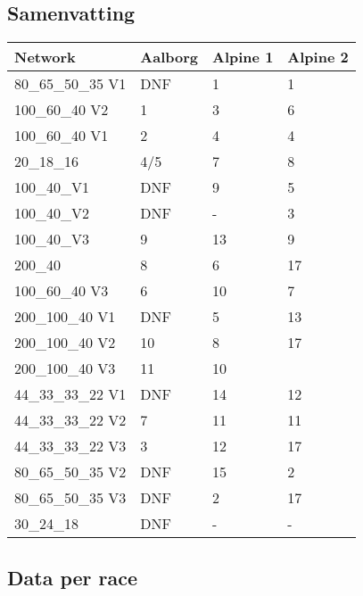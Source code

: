 \documentclass[a4paper,10pt]{scrartcl}
\begin{document}
\subsection*{Samenvatting}
\begin{table}[H]
\begin{tabular}{llll}
 \textbf{Network} & \textbf{Aalborg} & \textbf{Alpine 1} & \textbf{Alpine 2}\\ \hline
 80\_65\_50\_35 V1 & DNF & 1 & 1 \\
 100\_60\_40 V2 & 1 & 3 & 6\\
 100\_60\_40 V1 & 2 & 4 & 4 \\ \hline
 20\_18\_16 & 4/5 & 7 & 8 \\
 100\_40\_V1 & DNF & 9 & 5 \\
 100\_40\_V2 & DNF & - & 3\\
 100\_40\_V3 & 9 & 13 & 9 \\
 200\_40 & 8 & 6 & 17 \\
 100\_60\_40 V3 & 6 & 10 & 7 \\
 200\_100\_40 V1 & DNF & 5 & 13 \\
 200\_100\_40 V2 & 10 & 8 & 17\\
 200\_100\_40 V3 & 11 & 10 \\
 44\_33\_33\_22 V1 & DNF & 14 & 12\\
 44\_33\_33\_22 V2 & 7 & 11& 11\\
 44\_33\_33\_22 V3 & 3 & 12 & 17\\
 80\_65\_50\_35 V2 & DNF & 15 & 2\\
 80\_65\_50\_35 V3 & DNF & 2 & 17\\
 30\_24\_18 & DNF & - & - \\
\end{tabular}
\end{table}

\pagebreak
\subsection*{Data per race}
\end{document}
